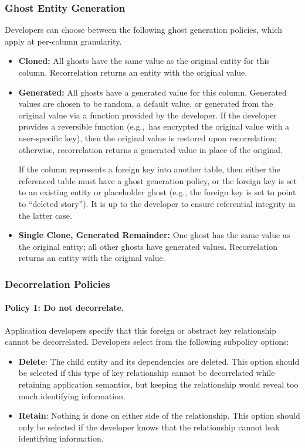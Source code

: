 \subsubsection{Ghost Entity Generation}
Developers can choose between the following ghost generation policies, which apply at 
per-column granularity.
\begin{itemize}
    \item \textbf{Cloned:} All ghosts have the same value as the original entity for this column.
        Recorrelation returns an entity with the original value.

    \item \textbf{Generated:} All ghosts have a generated value for this column. Generated values are
chosen to be random, a default value, or generated from the original value via a function provided by the developer.
        If the developer provides a reversible function (e.g.,\ has encrypted the original value
        with a user-specific key), then the original value is restored upon
        recorrelation; otherwise, recorrelation returns a generated value in place of the original.

        If the column represents a foreign key into another table, then either the referenced table must 
        have a ghost generation policy, or the foreign key is set to an existing entity or placeholder ghost (e.g.,
        the foreign key is set to point to ``deleted story''). It is up to the developer to ensure
        referential integrity in the latter case.

\item \textbf{Single Clone, Generated Remainder:} One ghost has the same value as the original
        entity; all other ghosts have generated values. Recorrelation returns an entity with the original value.
\end{itemize}


\subsubsection{Decorrelation Policies}

\paragraph{Policy 1: Do not decorrelate.}
Application developers specify that this foreign or abstract key relationship cannot be decorrelated.
Developers select from the following subpolicy options: 
\begin{itemize}
    \item \textbf{Delete}: The child entity and its dependencies are deleted. This option should be
        selected if this type of key relationship cannot be decorrelated while retaining application
        semantics, but keeping the relationship would reveal too much identifying information.

    \item \textbf{Retain}: Nothing is done on either side of the
        relationship. This option should only be selected if the developer knows that the
        relationship cannot leak identifying information.
   \end{itemize}

